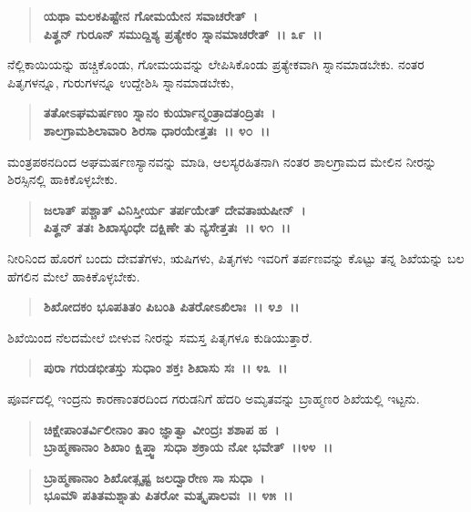 \begin{verse}
\textbf{ಯಥಾ ಮಲಕಪಿಷ್ಟೇನ ಗೋಮಯೇನ ಸವಾಚರೇತ್~।}\\\textbf{ಪಿತೄನ್ ಗುರೂನ್ ಸಮುದ್ದಿಶ್ಯ ಪ್ರತ್ಯೇಕಂ ಸ್ನಾನಮಾಚರೇತ್~।। ೩೯~।।}
\end{verse}

ನೆಲ್ಲಿಕಾಯಿಯನ್ನು ಹಚ್ಚಿಕೊಂಡು, ಗೋಮಯವನ್ನು ಲೇಪಿಸಿಕೊಂಡು ಪ್ರತ್ಯೇಕವಾಗಿ ಸ್ನಾನಮಾಡಬೇಕು. ನಂತರ ಪಿತೃಗಳನ್ನೂ, ಗುರುಗಳನ್ನೂ ಉದ್ದೇಶಿಸಿ ಸ್ನಾನಮಾಡಬೇಕು,

\begin{verse}
\textbf{ತತೋಽಘಮರ್ಷಣಂ ಸ್ನಾನಂ ಕುರ್ಯಾನ್ಮಂತ್ರಾದತಂದ್ರಿತಃ~।}\\\textbf{ಶಾಲಗ್ರಾಮಶಿಲಾವಾರಿ ಶಿರಸಾ ಧಾರಯೇತ್ತತಃ~।। ೪೦~।।}
\end{verse}

ಮಂತ್ರಪಠನದಿಂದ ಅಘಮರ್ಷಣಸ್ಯಾನವನ್ನು ಮಾಡಿ, ಆಲಸ್ಯರಹಿತನಾಗಿ ನಂತರ ಶಾಲಗ್ರಾಮದ ಮೇಲಿನ ನೀರನ್ನು ಶಿರಸ್ಸಿನಲ್ಲಿ ಹಾಕಿಕೊಳ್ಳಬೇಕು.

\begin{verse}
\textbf{ಜಲಾತ್ ಪಶ್ಚಾತ್ ವಿನಿಸ್ತೀರ್ಯ ತರ್ಪಯೇತ್ ದೇವತಾಋಷೀನ್~।}\\\textbf{ಪಿತೄನ್ ತತಃ ಶಿಖಾಸ್ಕಂಧೇ ದಕ್ಷಿಣೇ ತು ನ್ಯಸೇತ್ತತಃ~।। ೪೧~।। }
\end{verse}

ನೀರಿನಿಂದ ಹೊರಗೆ ಬಂದು ದೇವತೆಗಳು, ಋಷಿಗಳು, ಪಿತೃಗಳು ಇವರಿಗೆ ತರ್ಪಣವನ್ನು ಕೊಟ್ಟು ತನ್ನ ಶಿಖೆಯನ್ನು ಬಲ ಹೆಗಲಿನ ಮೇಲೆ ಹಾಕಿಕೊಳ್ಳಬೇಕು.

\begin{verse}
\textbf{ಶಿಖೋದಕಂ ಭೂಪತಿತಂ ಪಿಬಂತಿ ಪಿತರೋಽಖಿಲಾಃ~।। ೪೨~।।}
\end{verse}

ಶಿಖೆಯಿಂದ ನೆಲದಮೇಲೆ ಬೀಳುವ ನೀರನ್ನು ಸಮಸ್ತ ಪಿತೃಗಳೂ ಕುಡಿಯುತ್ತಾರೆ.

\begin{verse}
\textbf{ಪುರಾ ಗರುಡಭೀತಸ್ತು ಸುಧಾಂ ಶಕ್ತಃ ಶಿಖಾಸು ಸಃ~।। ೪೩~।।}
\end{verse}

ಪೂರ್ವದಲ್ಲಿ ಇಂದ್ರನು ಕಾರಣಾಂತರದಿಂದ ಗರುಡನಿಗೆ ಹೆದರಿ ಅಮೃತವನ್ನು ಬ್ರಾಹ್ಮಣರ ಶಿಖೆಯಲ್ಲಿ ಇಟ್ಟನು.

\begin{verse}
\textbf{ಚಿಕ್ಷೇಪಾಂತರ್ವಿಲೀನಾಂ ತಾಂ ಜ್ಞಾತ್ವಾ ವೀಂದ್ರಃ ಶಶಾಪ ಹ~।}\\\textbf{ಬ್ರಾಹ್ಮಣಾನಾಂ ಶಿಖಾಂ ಕ್ಷಿಪ್ತ್ವಾ ಸುಧಾ ಶಕ್ರಾಯ ನೋ ಭವೇತ್~।।೪೪~।।}
\end{verse}

\begin{verse}
\textbf{ಬ್ರಾಹ್ಮಣಾನಾಂ ಶಿಖೋತ್ಸೃಷ್ಟ ಜಲದ್ವಾರೇಣ ಸಾ ಸುಧಾ~।}\\\textbf{ಭೂಮೌ ಪತಿತಮಶ್ನಾತು ಪಿತರೋ ಮತ್ಕೃಪಾಲವಃ~।। ೪೫~।।}
\end{verse}

